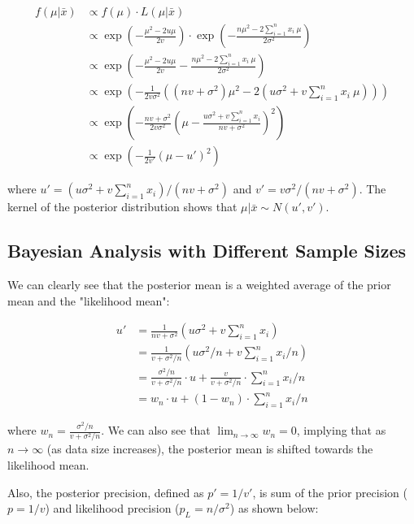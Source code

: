 \begin{align*}
f(\mu | \bar{x}) &\propto f(\mu) \cdot L(\mu | \bar{x}) \\
&\propto \exp\left(-\frac{\mu^2 - 2u \mu}{2v}\right) \cdot \exp\left(-\frac{n \mu^2 - 2\sum_{i = 1}^{n} x_i ~ \mu}{2\sigma^2}\right) \\
&\propto \exp\left(-\frac{\mu^2 - 2u \mu}{2v} - \frac{n \mu^2 - 2\sum_{i = 1}^{n} x_i ~ \mu}{2\sigma^2}\right) \\
&\propto \exp\left(-\frac{1}{2v \sigma^2} \left((n v + \sigma^2) \mu^2 - 2(u \sigma^2 + v \sum_{i = 1}^{n} x_i ~ \mu)\right)\right) \\
&\propto \exp\left(-\frac{n v + \sigma^2}{2v \sigma^2} \left(\mu - \frac{u \sigma^2 + v \sum_{i = 1}^{n} x_i}{n v + \sigma^2}\right)^2\right) \\
&\propto \exp\left(-\frac{1}{2v'} (\mu - u')^2\right)
\end{align*}

\noindent where $u' = \left(u \sigma^2 + v \sum_{i = 1}^{n} x_i\right) / (n v + \sigma^2)$ and $v' = v \sigma^2/(n v + \sigma^2)$.
The kernel of the posterior distribution shows that $\mu | \bar{x} \sim N(u', v')$.


\subsection{Bayesian Analysis with Different Sample Sizes}

We can clearly see that the posterior mean is a weighted average of the prior mean and the "likelihood mean":

\begin{align*}
u' &= \frac{1}{n v + \sigma^2} \left(u \sigma^2 + v \sum_{i = 1}^{n} x_i\right) \\
&= \frac{1}{v + \sigma^2 / n} \left(u \sigma^2 / n + v \sum_{i = 1}^{n} x_i / n\right) \\
&= \frac{\sigma^2 / n}{v + \sigma^2 / n} \cdot u + \frac{v}{v + \sigma^2 / n} \cdot \sum_{i = 1}^{n} x_i / n \\
&= w_n \cdot u + (1 - w_n) \cdot \sum_{i = 1}^{n} x_i / n
\end{align*}

where $w_n = \frac{\sigma^2 / n}{v + \sigma^2 / n}$.
We can also see that $\lim_{n \to \infty} w_n = 0$, implying that as $n \to \infty$ (as data size increases), the posterior mean is shifted towards the likelihood mean.

Also, the posterior precision, defined as $p' = 1 / v'$, is sum of the prior precision ($p = 1 / v$) and likelihood precision ($p_L = n / \sigma^2$) as shown below:

